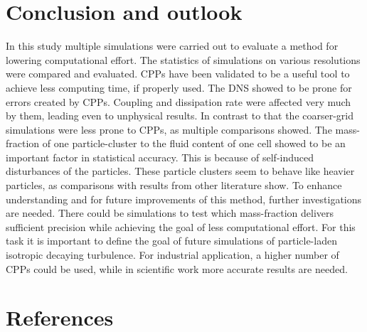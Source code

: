 \documentclass[11pt,a4paper,openany,oneside,parskip=half*]{article}
\begin{document}
\section{Conclusion and outlook}
In this study multiple simulations were carried out to evaluate a method for lowering computational effort. The statistics of simulations on various resolutions were compared and evaluated. CPPs have been validated to be a useful tool to achieve less computing time, if properly used.
\newline
The DNS showed to be prone for errors created by CPPs. Coupling and dissipation rate were affected very much by them, leading even to unphysical results. In contrast to that the coarser-grid simulations were less prone to CPPs, as multiple comparisons showed. The mass-fraction of one particle-cluster to the fluid content of one cell showed to be an important factor in statistical accuracy. This is because of self-induced disturbances of the particles. These particle clusters seem to behave like heavier particles, as comparisons with results from other literature show.
\newline
To enhance understanding and for future improvements of this method, further investigations are needed. There could be simulations to test which mass-fraction delivers sufficient precision while achieving the goal of less computational effort. For this task it is important to define the goal of future simulations of particle-laden isotropic decaying turbulence. For industrial application, a higher number of CPPs could be used, while in scientific work more accurate results are needed. 
\newline
\pagebreak
\section{References}
\vspace*{-1.2cm}
\nocite{*} %
\pagebreak
\end{document}
